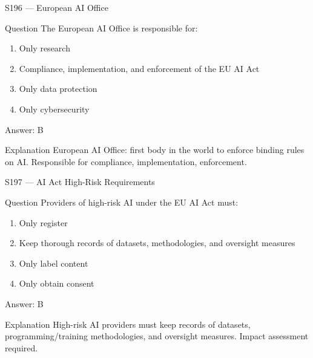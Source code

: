 \documentclass[aspectratio=169,8pt]{beamer}
\begin{document}
\begin{frame}{S196 --- European AI Office}
	\begin{block}{Question}
		The European AI Office is responsible for:
		\begin{enumerate}
			\item Only research
			\item Compliance, implementation, and enforcement of the EU AI Act
			\item Only data protection
			\item Only cybersecurity
		\end{enumerate}
	\end{block}
	\begin{exampleblock}{Answer: B}\end{exampleblock}
	\begin{block}{Explanation}
		European AI Office: first body in the world to enforce binding rules on AI. Responsible for compliance, implementation, enforcement.
	\end{block}
\end{frame}

\begin{frame}{S197 --- AI Act High-Risk Requirements}
	\begin{block}{Question}
		Providers of high-risk AI under the EU AI Act must:
		\begin{enumerate}
			\item Only register
			\item Keep thorough records of datasets, methodologies, and oversight measures
			\item Only label content
			\item Only obtain consent
		\end{enumerate}
	\end{block}
	\begin{exampleblock}{Answer: B}\end{exampleblock}
	\begin{block}{Explanation}
		High-risk AI providers must keep records of datasets, programming/training methodologies, and oversight measures. Impact assessment required.
	\end{block}
\end{frame}
\end{document}
